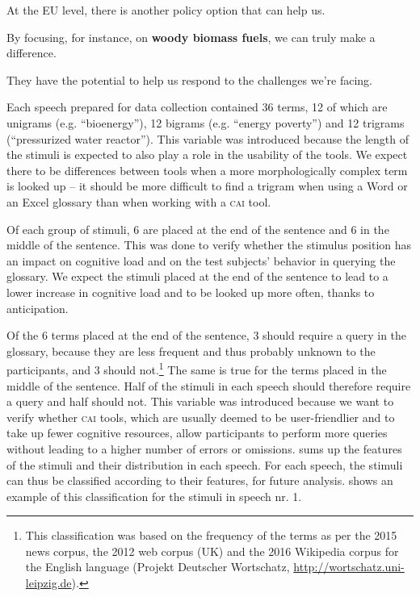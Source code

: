 \documentclass[output=paper]{langsci/langscibook}
\begin{document}
At the EU level, there is another policy option that can help us.

By focusing, for instance, on \textbf{woody biomass fuels}, we can truly make a difference.

They have the potential to help us respond to the challenges we’re facing.
\z

Each speech prepared for data collection contained 36 terms, 12 of which are unigrams (e.g. ``bioenergy''), 12 bigrams (e.g. ``energy poverty'') and 12 trigrams (``pressurized water reactor''). This variable was introduced because the length of the stimuli is expected to also play a role in the usability of the tools. We expect there to be differences between tools when a more morphologically complex term is looked up – it should be more difficult to find a trigram when using a Word or an Excel glossary than when working with a \textsc{cai} tool. 

Of each group of stimuli, 6 are placed at the end of the sentence and 6 in the middle of the sentence. This was done to verify whether the stimulus position has an impact on cognitive load and on the test subjects’ behavior in querying the glossary. We expect the stimuli placed at the end of the sentence to lead to a lower increase in cognitive load and to be looked up more often, thanks to anticipation. 

Of the 6 terms placed at the end of the sentence, 3 should require a query in the glossary, because they are less frequent and thus probably unknown to the participants, and 3 should not.\footnote{This classification was based on the frequency of the terms as per the 2015 news corpus, the 2012 web corpus (UK) and the 2016 Wikipedia corpus for the English language (Projekt Deutscher Wortschatz, \url{http://wortschatz.uni-leipzig.de}).} The same is true for the terms placed in the middle of the sentence. Half of the stimuli in each speech should therefore require a query and half should not. This variable was introduced because we want to verify whether \textsc{cai} tools, which are usually deemed to be user-friendlier and to take up fewer cognitive resources, allow participants to perform more queries without leading to a higher number of errors or omissions.  sums up the features of the stimuli and their distribution in each speech. For each speech, the stimuli can thus be classified according to their features, for future analysis.  shows an example of this classification for the stimuli in speech nr. 1.
\end{document}
